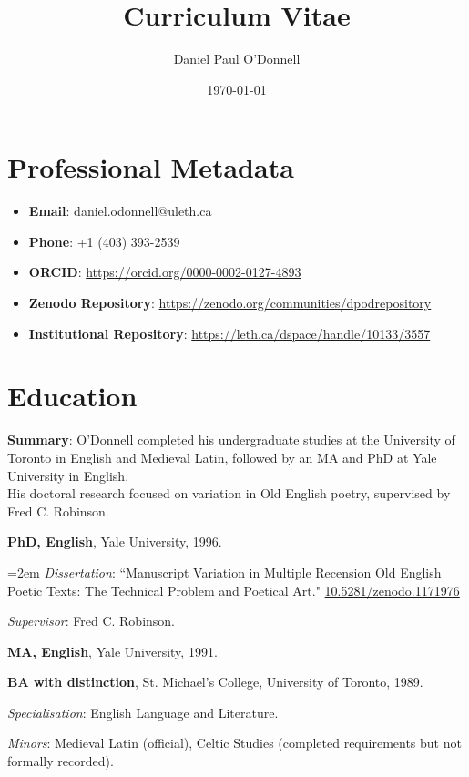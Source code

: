 \documentclass[12pt]{article}
\title{Curriculum Vitae}
\author{Daniel Paul O'Donnell}
\date{\today}
\begin{document}
\maketitle


\section*{Professional Metadata}
\begin{itemize}
  \item \textbf{Email}: daniel.odonnell@uleth.ca
  \item \textbf{Phone}: +1 (403) 393-2539
  \item \textbf{ORCID}: \url{https://orcid.org/0000-0002-0127-4893}
  \item \textbf{Zenodo Repository}: \url{https://zenodo.org/communities/dpodrepository}
  \item \textbf{Institutional Repository}: \url{https://leth.ca/dspace/handle/10133/3557}
\end{itemize}

\section*{Education}

\textbf{Summary}: O'Donnell completed his undergraduate studies at the University of Toronto in English and Medieval Latin, followed by an MA and PhD at Yale University in English.\\ His doctoral research focused on variation in Old English poetry, supervised by Fred C. Robinson.

\begin{adjustwidth}{2em}{0pt}

\textbf{PhD, English}, Yale University, 1996.
\begin{adjustwidth}{2em}{0pt}

\hangindent=2em
\textit{Dissertation}: “Manuscript Variation in Multiple Recension Old English Poetic Texts: The Technical Problem and Poetical Art." \href{https://doi.org/10.5281/zenodo.1171976}{10.5281/zenodo.1171976}

\textit{Supervisor}: Fred C. Robinson.
\end{adjustwidth}

\textbf{MA, English}, Yale University, 1991.

\textbf{BA with distinction}, St. Michael’s College, University of Toronto, 1989.
\begin{adjustwidth}{2em}{0pt}
\textit{Specialisation}: English Language and Literature.

\textit{Minors}: Medieval Latin (official), Celtic Studies (completed requirements but not formally recorded).
\end{adjustwidth}

\end{adjustwidth}
\end{document}
